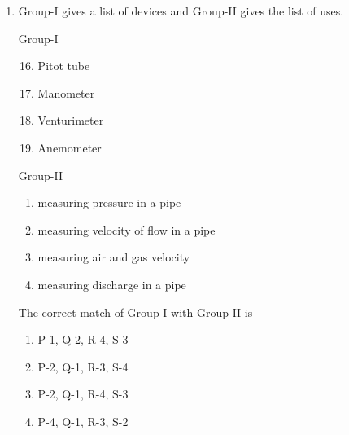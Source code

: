 \documentclass[journal]{IEEEtran}
\begin{document}
\begin{enumerate}
        \begin{multicols}{2}
            \begin{enumerate}
                \item P-1, Q-3, R-4, S-2
                \item P-1, Q-4, R-2, S-3
                \item P-3, Q-4, R-1, S-2
                \item P-4, Q-2, R-1, S-3
            \end{enumerate}
        \end{multicols}

    \item Group-I gives a list of devices and Group-II gives the list of uses.
        \begin{multicols}{2}
            Group-I
            \begin{enumerate}[label={\Alph*.}]
                \setcounter{enumii}{15}
                \item Pitot tube
                \item Manometer
                \item Venturimeter
                \item Anemometer
            \end{enumerate}
            \columnbreak
            Group-II
            \begin{enumerate}[label={\arabic*.}]
                \item measuring pressure in a pipe
                \item measuring velocity of flow in a pipe
                \item measuring air and gas velocity
                \item measuring discharge in a pipe
            \end{enumerate}
        \end{multicols}
        The correct match of Group-I with Group-II is
        
        \begin{multicols}{2}
            \begin{enumerate}
                \item P-1, Q-2, R-4, S-3
                \item P-2, Q-1, R-3, S-4
                \item P-2, Q-1, R-4, S-3
                \item P-4, Q-1, R-3, S-2
            \end{enumerate}
        \end{multicols}


\end{enumerate}
\end{document}
